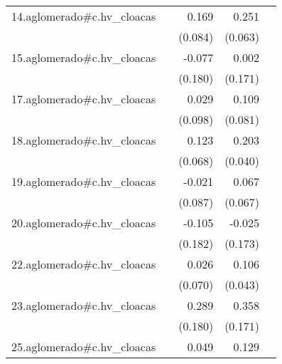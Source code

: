 {\begin{longtable}{l*{4}{D{.}{.}{-1}}}
\addlinespace
14.aglomerado#c.hv\_cloacas&                     &       0.169\sym{*}  &       0.251\sym{***}&                     \\
            &                     &     (0.084)         &     (0.063)         &                     \\
\addlinespace
15.aglomerado#c.hv\_cloacas&                     &      -0.077         &       0.002         &                     \\
            &                     &     (0.180)         &     (0.171)         &                     \\
\addlinespace
17.aglomerado#c.hv\_cloacas&                     &       0.029         &       0.109         &                     \\
            &                     &     (0.098)         &     (0.081)         &                     \\
\addlinespace
18.aglomerado#c.hv\_cloacas&                     &       0.123         &       0.203\sym{***}&                     \\
            &                     &     (0.068)         &     (0.040)         &                     \\
\addlinespace
19.aglomerado#c.hv\_cloacas&                     &      -0.021         &       0.067         &                     \\
            &                     &     (0.087)         &     (0.067)         &                     \\
\addlinespace
20.aglomerado#c.hv\_cloacas&                     &      -0.105         &      -0.025         &                     \\
            &                     &     (0.182)         &     (0.173)         &                     \\
\addlinespace
22.aglomerado#c.hv\_cloacas&                     &       0.026         &       0.106\sym{*}  &                     \\
            &                     &     (0.070)         &     (0.043)         &                     \\
\addlinespace
23.aglomerado#c.hv\_cloacas&                     &       0.289         &       0.358\sym{*}  &                     \\
            &                     &     (0.180)         &     (0.171)         &                     \\
\addlinespace
25.aglomerado#c.hv\_cloacas&                     &       0.049         &       0.129\sym{*}  &                     \\

\end{longtable}}
